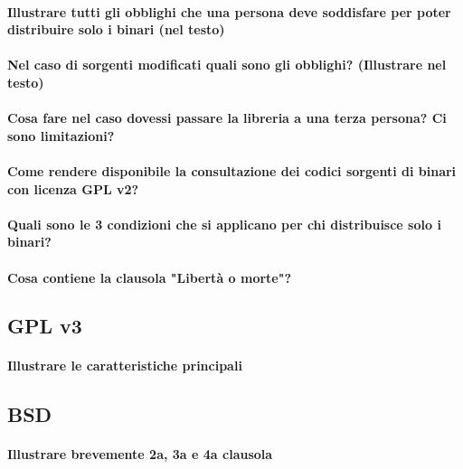 \documentclass[a4paper]{article}
\begin{document}
			\paragraph{Illustrare tutti gli obblighi che una persona deve soddisfare per poter distribuire solo i binari 	(nel testo)}
		
			\paragraph{Nel caso di sorgenti modificati quali sono gli obblighi? (Illustrare nel testo)}
		
			\paragraph{Cosa fare nel caso dovessi passare la libreria a una terza persona? Ci sono limitazioni?}
			
			\paragraph{Come rendere disponibile la consultazione dei codici sorgenti di binari con licenza GPL v2?} %
			
			\paragraph{Quali sono le 3 condizioni che si applicano per chi distribuisce solo i binari?}
			
			\paragraph{Cosa contiene la clausola "Libertà o morte"?}
		
		\subsection{GPL v3}
			
			\paragraph{Illustrare le caratteristiche principali}
		
		\subsection{BSD}
		
			\paragraph{Illustrare brevemente 2a, 3a e 4a clausola}
			
\end{document}
